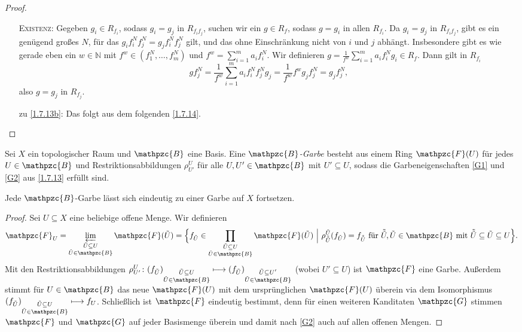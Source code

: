 \documentclass[a4paper,12pt]{scrbook}
\newtheorem{proof}{Beweis}
\newcommand{\set}[1]{\ensuremath{\mathbb{#1}}}
\newcommand{\N}{\set{N}}
\renewcommand{\mapsto}{\longmapsto}
\begin{document}
\begin{proof}
\begin{enumerate}
    \textsc{Existenz}: Gegeben $g_i\in R_{f_i}$, sodass $g_i=g_j$ in $R_{f_if_j}$, suchen wir ein $g\in R_f$, sodass $g=g_i$ in
    allen $R_{f_i}$. Da $g_i=g_j$ in $R_{f_if_j}$, gibt es ein genügend großes $N$, für das $g_if_i^Nf_j^N=g_jf_i^Nf_j^N$ gilt,
    und das ohne Einschränkung nicht von $i$ und $j$ abhängt. Insbesondere gibt es wie gerade eben ein $w\in\N$ mit
    $f^w\in(f_1^N,\dotsc,f_m^N)$ und $f^w=\sum_{i=1}^ma_if_i^N$. Wir definieren $g=\frac{1}{f^w}\sum_{i=1}^ma_if_i^Ng_i\in
    R_f$. Dann gilt in $R_{f_i}$
    \[ gf_j^N=\frac{1}{f^w}\sum_{i=1}^ma_if_i^Nf_j^Ng_j=\frac{1}{f^w}f^wg_jf_j^N=g_jf_j^N, \]
    also $g=g_j$ in $R_{f_j}$.
  \item [zu] \ref{1.7.13b}: Das folgt aus dem folgenden \cref{1.7.14}.
  \end{enumerate}
\end{proof}

\begin{lem}\label{1.7.14}
  Sei $X$ ein topologischer Raum und $\mathpzc{B}$ eine Basis. Eine \emph{$\mathpzc{B}$-Garbe} besteht aus einem Ring
  $\mathpzc{F}(U)$ für jedes $U\in\mathpzc{B}$ und Restriktionsabbildungen $\rho_{U'}^U$ für alle $U,U'\in\mathpzc{B}$ mit
  $U'\subseteq U$, sodass die Garbeneigenschaften \ref{G1} und \ref{G2} aus \cref{1.7.13} erfüllt sind.

  Jede $\mathpzc{B}$-Garbe lässt sich eindeutig zu einer Garbe auf $X$ fortsetzen.
\end{lem}
\begin{proof}
  Sei $U\subseteq X$ eine beliebige offene Menge. Wir definieren
  \[ \mathpzc{F}_U = \varprojlim_{\substack{\tilde{U}\subseteq U\\\tilde{U}\in\mathpzc{B}}}\mathpzc{F}(\tilde{U}) =
     \Bigl\{f_{\tilde{U}}\in\prod_{\substack{\tilde{U}\subseteq U\\\tilde{U}\in\mathpzc{B}}}\mathpzc{F}(\tilde{U}) \ \Big|\ 
     \rho_{\tilde{\tilde{U}}}^{\tilde{U}}(f_{\tilde{U}})=f_{\tilde{\tilde{U}}}\text{ für }
     \tilde{\tilde{U}},\tilde{U}\in\mathpzc{B} \text{ mit } \tilde{\tilde{U}}\subseteq\tilde{U}\subseteq U \Bigr\}. \]
     Mit den Restriktionsabbildungen
     $\rho_{U'}^U\colon (f_{\tilde{U}})_{\substack{\tilde{U}\subseteq U\\\tilde{U}\in\mathpzc{B}}} \mapsto
     (f_{\tilde{U}})_{\substack{\tilde{U}\subseteq U'\\\tilde{U}\in\mathpzc{B}}}$ (wobei $U'\subseteq U$) ist $\mathpzc{F}$ eine
     Garbe. Außerdem stimmt für $U\in\mathpzc{B}$ das neue $\mathpzc{F}(U)$ mit dem ursprünglichen $\mathpzc{F}(U)$ überein via
     dem Isomorphismus $(f_{\tilde{U}})_{\substack{\tilde{U}\subseteq U\\\tilde{U}\in\mathpzc{B}}} \mapsto f_U$.
     Schließlich ist $\mathpzc{F}$ eindeutig bestimmt, denn für einen weiteren Kanditaten $\mathpzc{G}$ stimmen $\mathpzc{F}$
     und $\mathpzc{G}$ auf jeder Basismenge überein und damit nach \ref{G2} auch auf allen offenen Mengen.
\end{proof}
\end{document}
